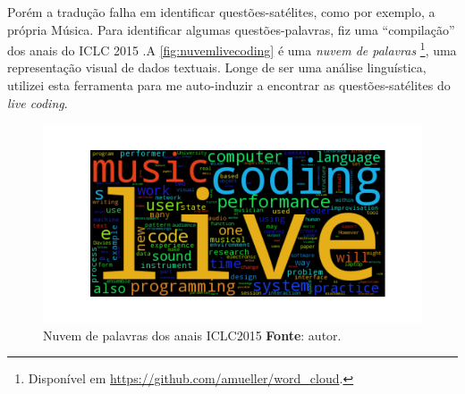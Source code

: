 Porém a tradução falha em identificar questões-satélites, como por exemplo, a própria Música. Para identificar algumas questões-palavras,
fiz uma ``compilação'' dos anais do ICLC 2015 \cite{ICLC2015} .A \autoref{fig:nuvemlivecoding} é uma \emph{nuvem de palavras} \footnote{Disponível em \url{https://github.com/amueller/word_cloud}.}, uma representação visual de dados textuais. Longe de ser uma análise linguística, utilizei esta ferramenta para me auto-induzir a encontrar as questões-satélites do \emph{live coding}.

\begin{figure}[!h]
\begin{center}
\centering
\includegraphics[scale=0.71]{./imagens/livecoding_cloud1.png}
\caption{Nuvem de palavras dos anais ICLC2015 \textbf{Fonte}: autor.}
\label{fig:nuvemlivecoding}
\end{center}
\end{figure}

